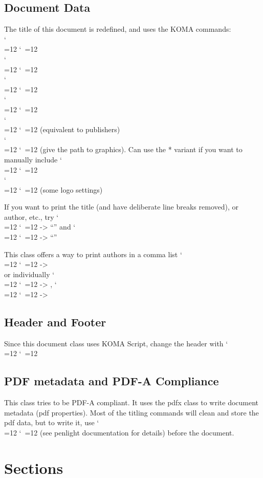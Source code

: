 \documentclass{corpboreport}
\def\cmd{\bgroup\catcode`\\=12 \catcode`\ =12 \cmdA}
\def\cmdA#1{\egroup{\texttt{\detokenize{#1}}}}
\begin{document}
\subsection{Document Data}
The title of this document is redefined, and uses the KOMA commands:\\
\cmd{\title{}}\\
\cmd{\subtitle{}}\\
\cmd{\author{}}\\
\cmd{\date{}}\\
\cmd{\company{}} (equivalent to publishers)\\
\cmd{\logo{}} (give the path to graphics). Can use the * variant if you want to manually include \cmd{\includegraphics}\\
\cmd{\logoset} (some logo settings)

If you want to print the title (and have deliberate line breaks removed), or author, etc.,
try \cmd{\thetitle} -> ``\thetitle'' and \cmd{\theauthor} -> ``\theauthor''

This class offers a way to print authors in a comma list \cmd{\theauthors} -> \theauthors\\
or individually \cmd{\theauthors[1]} -> \theauthors[1], \cmd{\theauthors[2]} -> \theauthors[2]\\

\begin{itemize}
  \listauthors
\end{itemize}

\subsection{Header and Footer}
Since this document class uses KOMA Script, change the header with
\cmd{\lohead{}, \rohead{}}




\subsection{PDF metadata and PDF-A Compliance}

This class tries to be PDF-A compliant.
It uses the pdfx class to write document metadata (pdf properties).
Most of the titling commands will clean and store the pdf data, but to write it,
use \cmd{\writePDFmetadata} (see penlight documentation for details) before the document.


\section{Sections}\label{s.sett}
\end{document}
